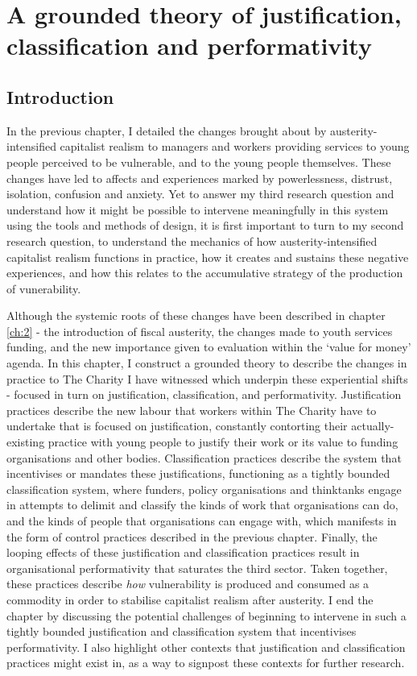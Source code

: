 \chapter{A grounded theory of justification, classification and performativity}
\label{ch:6}

\section{Introduction}
\label{sec:6-1-intro}
In the previous chapter, I detailed the changes brought about by austerity-intensified capitalist realism to managers and workers providing services to young people perceived to be vulnerable, and to the young people themselves. These changes have led to affects and experiences marked by powerlessness, distrust, isolation, confusion and anxiety. Yet to answer my third research question and understand how it might be possible to intervene meaningfully in this system using the tools and methods of design, it is first important to turn to my second research question, to understand the mechanics of how austerity-intensified capitalist realism functions in practice, how it creates and sustains these negative experiences, and how this relates to the accumulative strategy of the production of vunerability.

Although the systemic roots of these changes have been described in chapter \ref{ch:2} - the introduction of fiscal austerity, the changes made to youth services funding, and the new importance given to evaluation within the ‘value for money’ agenda. In this chapter, I construct a grounded theory to describe the changes in practice to The Charity I have witnessed which underpin these experiential shifts - focused in turn on justification, classification, and performativity. Justification practices describe the new labour that workers within The Charity have to undertake that is focused on justification, constantly contorting their actually-existing practice with young people to justify their work or its value to funding organisations and other bodies. Classification practices describe the system that incentivises or mandates these justifications, functioning as a tightly bounded classification system, where funders, policy organisations and thinktanks engage in attempts to delimit and classify the kinds of work that organisations can do, and the kinds of people that organisations can engage with, which manifests in the form of control practices described in the previous chapter. Finally, the looping effects of these justification and classification practices result in organisational performativity that saturates the third sector. Taken together, these practices describe \emph{how} vulnerability is produced and consumed as a commodity in order to stabilise capitalist realism after austerity.  I end the chapter by discussing the potential challenges of beginning to intervene in such a tightly bounded justification and classification system that incentivises performativity. I also highlight other contexts that justification and classification practices might exist in, as a way to signpost these contexts for further research. 

